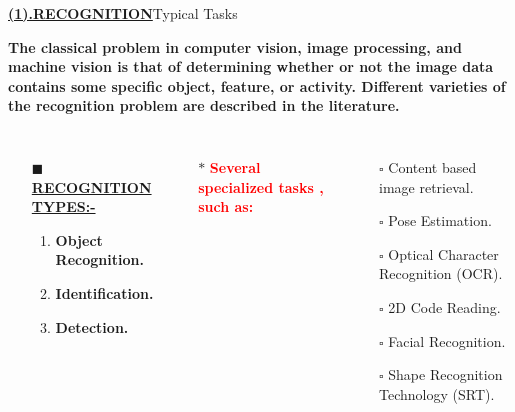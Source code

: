 \documentclass{beamer}
\begin{document}
{

\begin{frame}{\textbf{\underline{(1).RECOGNITION}}}{Typical Tasks} \pause
{}
\begin{block}{}\textbf{The classical problem in computer vision, image processing, and machine vision is that of determining whether or not the image data contains some specific object, feature, or activity. Different varieties of the recognition problem are described in the literature.}\pause
\end{block}
\begin{columns}
\begin{itemize}
\item [$\blacksquare$]\textbf{\underline{RECOGNITION TYPES:-}}\pause

\begin{enumerate}
	\item \textbf{Object Recognition.}\pause
	\item \textbf{Identification.}\pause
	\item \textbf{Detection.}\pause
\end{enumerate}
\end{itemize}
\begin{itemize}
\item [$\ast$]\textbf{\textcolor{red}{Several specialized tasks , such as:}}\pause
\end{itemize}
\begin{itemize}
\item [$\square$]Content based image retrieval.
\item [$\square$]Pose Estimation.
\item [$\square$]Optical Character Recognition (OCR).
\item [$\square$]2D Code Reading.
\item [$\square$]Facial Recognition.
\item [$\square$]Shape Recognition Technology (SRT).
\end{itemize}
\end{columns}
\end{frame}

}
\end{document}
